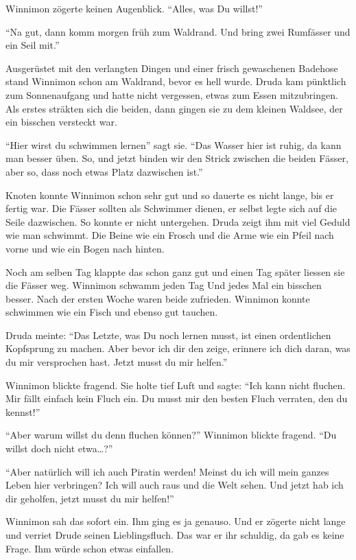 Winnimon zögerte keinen Augenblick. \enquote{Alles, was Du willst!}

\enquote{Na gut, dann komm morgen früh zum Waldrand. Und bring zwei Rumfässer und ein Seil mit.}

Ausgerüstet mit den verlangten Dingen und einer frisch gewaschenen Badehose stand Winnimon schon am Waldrand, bevor es hell wurde. Druda kam pünktlich zum Sonnenaufgang und hatte nicht vergessen, etwas zum Essen mitzubringen. Als erstes sträkten sich die beiden, dann gingen sie zu dem kleinen Waldsee, der ein bisschen versteckt war.

\enquote{Hier wirst du schwimmen lernen} sagt sie. \enquote{Das Wasser hier ist ruhig, da kann man besser üben. So, und jetzt binden wir den Strick zwischen die beiden Fässer, aber so, dass noch etwas Platz dazwischen ist.}

Knoten konnte Winnimon schon sehr gut und so dauerte es nicht lange, bis er fertig war. Die Fässer sollten als Schwimmer dienen, er selbst legte sich auf die Seile dazwischen. So konnte er nicht untergehen. Druda zeigt ihm mit viel Geduld wie man schwimmt. Die Beine wie ein Frosch und die Arme wie ein Pfeil nach vorne und wie ein Bogen nach hinten.

Noch am selben Tag klappte das schon ganz gut und einen Tag später liessen sie die Fässer weg. Winnimon schwamm jeden Tag Und jedes Mal ein bisschen besser. Nach der ersten Woche waren beide zufrieden. Winnimon konnte schwimmen wie ein Fisch und ebenso gut tauchen.

Druda meinte: \enquote{Das Letzte, was Du noch lernen musst, ist einen ordentlichen Kopfsprung zu machen. Aber bevor ich dir den zeige, erinnere ich dich daran, was du mir versprochen hast. Jetzt musst du mir helfen.}

Winnimon blickte fragend. Sie holte tief Luft und sagte: \enquote{Ich kann nicht fluchen. Mir fällt einfach kein Fluch ein. Du musst mir den besten Fluch verraten, den du kennst!}

\enquote{Aber warum willst du denn fluchen können?} Winnimon blickte fragend. \enquote{Du willst doch nicht etwa\dots?}

\enquote{Aber natürlich will ich auch Piratin werden! Meinst du ich will mein ganzes Leben hier verbringen? Ich will auch raus und die Welt sehen. Und jetzt hab ich dir geholfen, jetzt musst du mir helfen!}

Winnimon sah das sofort ein. Ihm ging es ja genauso. Und er zögerte nicht lange und verriet Drude seinen Lieblingsfluch. Das war er ihr schuldig, da gab es keine Frage. Ihm würde schon etwas einfallen.

